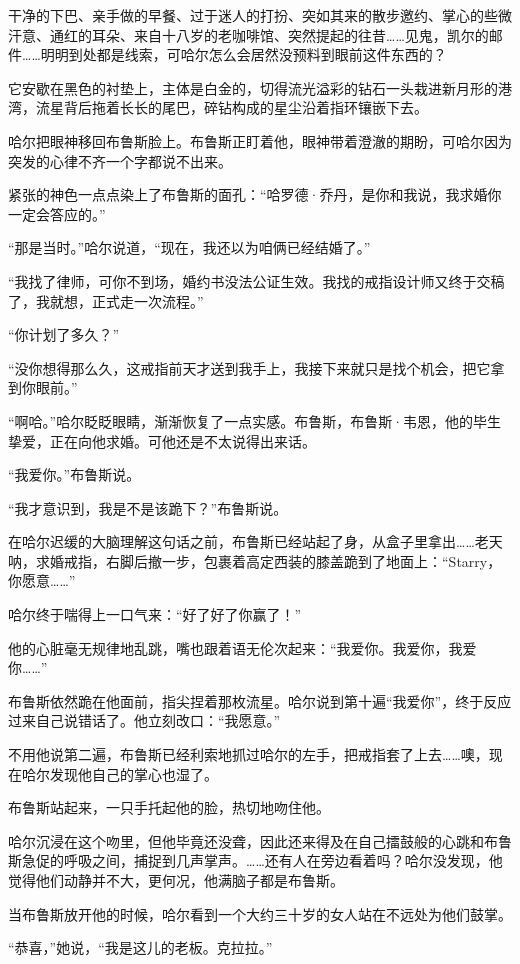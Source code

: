 \documentclass[../main]{subfiles}
\begin{document}
干净的下巴、亲手做的早餐、过于迷人的打扮、突如其来的散步邀约、掌心的些微汗意、通红的耳朵、来自十八岁的老咖啡馆、突然提起的往昔……见鬼，凯尔的邮件……明明到处都是线索，可哈尔怎么会居然没预料到眼前这件东西的？

它安歇在黑色的衬垫上，主体是白金的，切得流光溢彩的钻石一头栽进新月形的港湾，流星背后拖着长长的尾巴，碎钻构成的星尘沿着指环镶嵌下去。

哈尔把眼神移回布鲁斯脸上。布鲁斯正盯着他，眼神带着澄澈的期盼，可哈尔因为突发的心律不齐一个字都说不出来。

紧张的神色一点点染上了布鲁斯的面孔：“哈罗德·乔丹，是你和我说，我求婚你一定会答应的。”

“那是当时。”哈尔说道，“现在，我还以为咱俩已经结婚了。”

“我找了律师，可你不到场，婚约书没法公证生效。我找的戒指设计师又终于交稿了，我就想，正式走一次流程。”

“你计划了多久？”

“没你想得那么久，这戒指前天才送到我手上，我接下来就只是找个机会，把它拿到你眼前。”

“啊哈。”哈尔眨眨眼睛，渐渐恢复了一点实感。布鲁斯，布鲁斯·韦恩，他的毕生挚爱，正在向他求婚。可他还是不太说得出来话。

“我爱你。”布鲁斯说。

“我才意识到，我是不是该跪下？”布鲁斯说。

在哈尔迟缓的大脑理解这句话之前，布鲁斯已经站起了身，从盒子里拿出……老天呐，求婚戒指，右脚后撤一步，包裹着高定西装的膝盖跪到了地面上：“Starry，你愿意……”

哈尔终于喘得上一口气来：“好了好了你赢了！”

他的心脏毫无规律地乱跳，嘴也跟着语无伦次起来：“我爱你。我爱你，我爱你……”

布鲁斯依然跪在他面前，指尖捏着那枚流星。哈尔说到第十遍“我爱你”，终于反应过来自己说错话了。他立刻改口：“我愿意。”

不用他说第二遍，布鲁斯已经利索地抓过哈尔的左手，把戒指套了上去……噢，现在哈尔发现他自己的掌心也湿了。

布鲁斯站起来，一只手托起他的脸，热切地吻住他。

哈尔沉浸在这个吻里，但他毕竟还没聋，因此还来得及在自己擂鼓般的心跳和布鲁斯急促的呼吸之间，捕捉到几声掌声。……还有人在旁边看着吗？哈尔没发现，他觉得他们动静并不大，更何况，他满脑子都是布鲁斯。

当布鲁斯放开他的时候，哈尔看到一个大约三十岁的女人站在不远处为他们鼓掌。

“恭喜，”她说，“我是这儿的老板。克拉拉。”
\end{document}
